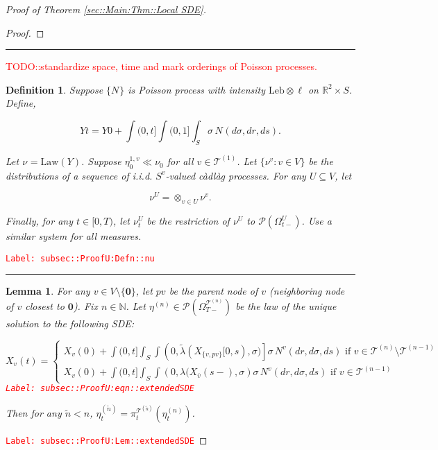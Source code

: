 \documentclass[12pt]{article}
\newcommand{\mb}{\mathbb}
\newcommand{\mc}{\mathcal}
\newcommand{\ov}{\overline}
\newcommand{\te}{\text}
\newcommand{\tr}{\textcolor{red}}
\newcommand{\labe}[1]{\tr{\texttt{Label: #1}}}
\newcommand{\lin}{\rule{\linewidth}{0.4 pt}}
\newcommand{\pmsr}{\mc{P}}							%
\renewcommand{\root}{\mathbf{0}}				%
\renewcommand{\v}{v}							%
\renewcommand{\U}{U}							%
\renewcommand{\S}{S}							%
\newcommand{\s}{\sigma}							%
\newcommand{\T}{T}								%
\renewcommand{\t}{t}							%
\newcommand{\sset}{\Omega}						%
\newcommand{\proj}{\pi}							%
\renewcommand{\tt}{s}							%
\newcommand{\X}{X}								%
\newcommand{\vind}[1]{^{#1}}					%
\newcommand{\carp}[1]{^{#1}}					%
\newcommand{\vsi}[1]{^{#1}}						%
\newcommand{\cind}[1]{_{#1}}					%
\newcommand{\cl}{\ov}							%
\newcommand{\tp}[1]{(#1)}						%
\newcommand{\tip}[1]{#1}						%
\newcommand{\ts}[1]{_{#1}}						%
\newcommand{\slnvind}[2]{^{#1,#2}}				%
\newcommand{\tree}{\mc{T}}						%
\newcommand{\sln}[1]{^{(#1)}}					%
\newcommand{\poiss}{N}							%
\newcommand{\leb}{\te{Leb}}						%
\newcommand{\Sm}{\ell}							%
\newcommand{\rate}{\lambda}						%
\renewcommand{\r}{r}							%
\newcommand{\alt}[1]{\widetilde{#1}}			%
\newcommand{\mm}{\nu}							%
\newcommand{\mmm}{\eta}							%
\newcommand{\law}{\te{Law}}						%
\newcommand{\XX}{Y}								%
\newcommand{\crate}{\alt{\lambda}}				%
\newcommand{\p}{p}								%
\newtheorem{lem}[thms]{Lemma}
\newtheorem{defn}[thms]{Definition}
\begin{document}
\begin{proof}[Proof of Theorem \ref{sec::Main:Thm::Local SDE}]
\begin{proof}
\end{proof}

\lin

\tr{TODO::standardize space, time and mark orderings of Poisson processes.}

\begin{defn}
Suppose \(\{\poiss\vind{}\}\) is Poisson process with intensity \(\leb\otimes \Sm\) on \(\mb{R}^2\times \S\). Define,

\[\XX{}{\t} = \XX{}{0} + \int{(0,\t]}\int{(0,1]}\int_\S\s\,\poiss\vind{}(d\s,d\r,d\tt).\]

Let \(\mm\vind{}\ts{} = \law(\XX{}{})\). Suppose \(\mmm\slnvind{1}{\v}\ts{0}\ll\mm\vind{}\ts{0}\) for all \(\v\in\tree\sln{1}\). Let \(\{\mm\vind{\v}\ts{}:\v\in V\}\) be the distributions of a sequence of i.i.d. \(\S\carp{\v}\)-valued c\`adl\`ag processes. For any \(\U\subseteq V\), let 

\[\mm\vind{\U}\ts{} = \otimes_{\v\in\U} \mm\vind{\v}\ts{}.\]

Finally, for any \(\t\in [0,\T)\), let \(\mm\vind{\U}\ts{\t}\) be the restriction of \(\mm\vind{\U}\ts{}\) to \(\pmsr(\sset\vsi{\U}\ts{\t-})\). Use a similar system for all measures.
\label{subsec::ProofU:Defn::nu}
\end{defn}
\labe{subsec::ProofU:Defn::nu}

\lin

\begin{lem}
For any \(\v \in V\setminus\{\root\}\), let \(\p{\v}\) be the parent node of \(\v\) (neighboring node of \(\v\) closest to \(\root\)). Fix \(n \in \mb{N}\). Let \(\mmm\sln{n}\ts{} \in \pmsr\left(\sset\vsi{\tree\sln{n}}\ts{\T-}\right)\) be the law of the unique solution to the following SDE:

\begin{equation}
\X\cind{\v}\tp{\t} = \begin{cases}
\X\cind{\v}\tp{0} + \int{(0,\t]}\int_\S\int{\left(0,\crate{}{}(\X\cind{\{\v,\p{\v}\}}\tip{[0,\tt)},\s)\right]}\s\,\poiss\vind{\v}(d\r,d\s,d\tt)\te{ if } \v \in \tree\sln{n}\setminus \tree\sln{n-1}\\
\X\cind{\v}\tp{0} + \int{(0,\t]}\int_\S\int{\left(0,\rate{}(\X\cind{\cl{\v}}\tp{\tt-},\s\right)}\s\,\poiss\vind{\v}(d\r,d\s,d\tt)\te{ if } \v \in \tree\sln{n-1}
\end{cases}
\label{subsec::ProofU:eqn::extendedSDE}
\end{equation}
\labe{subsec::ProofU:eqn::extendedSDE}

Then for any \(\alt{n} < n\), \(\mmm\sln{\alt{n}}\ts{\t} = \proj\vsi{\tree\sln{\alt{n}}}\ts{\t}(\mmm\sln{n}\ts{\t})\).
\label{subsec::ProofU:Lem::extendedSDE}
\end{lem}
\labe{subsec::ProofU:Lem::extendedSDE}


\end{proof}
\end{document}
